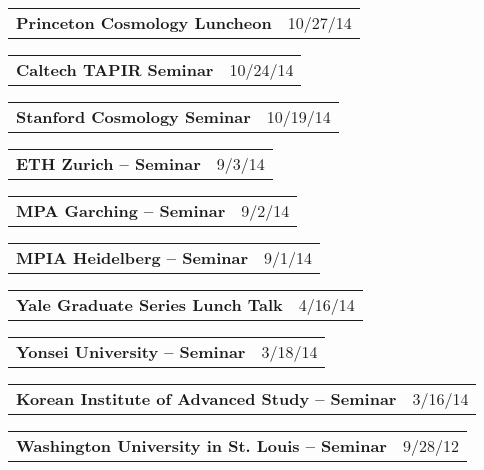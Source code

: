 \documentclass[letterpaper,11pt]{article}
\makeatletter
\newcommand{\activitiesbf}[2]{
  \begin{tabular*}{7.05in}{l@{\extracolsep{\fill}}r}
    {\bf #1}&#2
    \end{tabular*}\vspace{-10pt}
}
\makeatother
\begin{document}
\activitiesbf{Princeton Cosmology Luncheon}{10/27/14}
 
\activitiesbf{Caltech TAPIR Seminar}{10/24/14}

\activitiesbf{Stanford Cosmology Seminar}{10/19/14}

\activitiesbf{ETH Zurich -- Seminar}{9/3/14}

\activitiesbf{MPA Garching -- Seminar}{9/2/14}

\activitiesbf{MPIA Heidelberg -- Seminar}{9/1/14}
% 

\activitiesbf{Yale Graduate Series Lunch Talk}{4/16/14}

\activitiesbf{Yonsei University -- Seminar}{3/18/14}

\activitiesbf{Korean Institute of Advanced Study -- Seminar}{3/16/14}

\activitiesbf{Washington University in St. Louis -- Seminar}{9/28/12}
\end{document}
